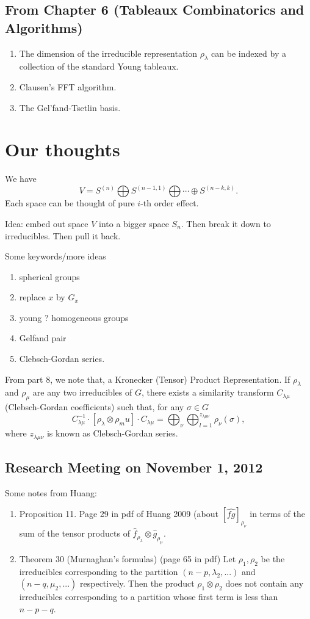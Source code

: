 \documentclass[10pt,reqno]{amsart}
\theoremstyle{definition}
\numberwithin{equation}{section}
\begin{document}
\subsection{From Chapter 6 (Tableaux Combinatorics
and Algorithms)}
\begin{enumerate}
\item  The dimension of the irreducible 
representation $\rho_\lambda$ can be 
indexed by a collection of the 
standard Young tableaux.
\item Clausen's FFT algorithm.
\item The Gel'fand-Tsetlin basis.
\end{enumerate}


\section{Our thoughts}
We have
\begin{equation}
V = S^{(n)}\bigoplus S^{(n-1, 1)} \bigoplus
\cdots \oplus S^{(n-k,k)}.
\end{equation}
Each space can be thought of pure $i$-th
order effect.

Idea: embed out space $V$
into a bigger space $S_n$.
Then break it down to irreducibles.
Then pull it back.

Some keywords/more ideas
\begin{enumerate}
\item spherical groups
\item replace $x$ by $G_x$
\item young ? homogeneous groups
\item Gelfand pair
\item Clebsch-Gordan series.
\end{enumerate}

From part 8, we note that,
a Kronecker (Tensor) Product Representation.
If $\rho_\lambda$ and $\rho_\mu$ are any
two irreducibles of $G$, there exists a similarity
transform $C_{\lambda\mu}$ (Clebsch-Gordan coefficients) such that, for any
$\sigma\in G$
\[C_{\lambda\mu}^{-1}\cdot[\rho_\lambda\otimes\rho_mu]
\cdot C_{\lambda\mu}
=
\bigoplus_{\nu}\bigoplus_{l=1}^{z_{\lambda\mu\nu}}
\rho_\nu(\sigma),
\]
where $z_{\lambda\mu\nu}$ is known 
as Clebsch-Gordan series.

\subsection{Research Meeting on November 1, 2012}
Some notes from Huang: 
\begin{enumerate}
\item Proposition 11. Page 29 in pdf 
of Huang 2009 (about 
$[\hat{fg}]_{\rho_\nu}$
in terms of the sum of the tensor products
of $\hat{f}_{\rho_\lambda}\otimes \hat{g}_{\rho_\mu}$.

\item Theorem 30 (Murnaghan's formulas)  (page 65 in pdf) Let $\rho_1,\rho_2$ be the irreducibles corresponding to the partition 
$(n - p, \lambda_2 ,...)$ and
$(n - q, \mu_2 ,...)$ respectively. Then the product
$\rho_1\otimes \rho_2$ does not contain any irreducibles corresponding to a partition whose first term is less than $n - p - q$.
\end{enumerate}
\end{document}
